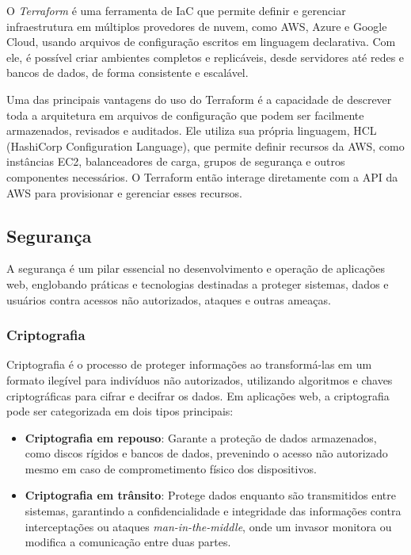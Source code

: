 O \emph{Terraform} é uma ferramenta de IaC que permite definir e gerenciar infraestrutura em múltiplos provedores de nuvem, como AWS, Azure e Google Cloud, usando arquivos de configuração escritos em linguagem declarativa\cite{terraform-docs}. Com ele, é possível criar ambientes completos e replicáveis, desde servidores até redes e bancos de dados, de forma consistente e escalável.

Uma das principais vantagens do uso do Terraform é a capacidade de descrever toda a arquitetura em arquivos de configuração que podem ser facilmente armazenados, revisados e auditados. Ele utiliza sua própria linguagem, HCL (HashiCorp Configuration Language), que permite definir recursos da AWS, como instâncias EC2, balanceadores de carga, grupos de segurança e outros componentes necessários. O Terraform então interage diretamente com a API da AWS para provisionar e gerenciar esses recursos.




\subsection{Segurança}

A segurança é um pilar essencial no desenvolvimento e operação de aplicações web, englobando práticas e tecnologias destinadas a proteger sistemas, dados e usuários contra acessos não autorizados, ataques e outras ameaças.


\subsubsection{Criptografia}


Criptografia é o processo de proteger informações ao transformá-las em um formato ilegível para indivíduos não autorizados, utilizando algoritmos e chaves criptográficas para cifrar e decifrar os dados. Em aplicações web, a criptografia pode ser categorizada em dois tipos principais:

\begin{itemize}
    \item \textbf{Criptografia em repouso}: Garante a proteção de dados armazenados, como discos rígidos e bancos de dados, prevenindo o acesso não autorizado mesmo em caso de comprometimento físico dos dispositivos.
    \item \textbf{Criptografia em trânsito}: Protege dados enquanto são transmitidos entre sistemas, garantindo a confidencialidade e integridade das informações contra interceptações ou ataques \emph{man-in-the-middle}, onde um invasor monitora ou modifica a comunicação entre duas partes.
\end{itemize}

